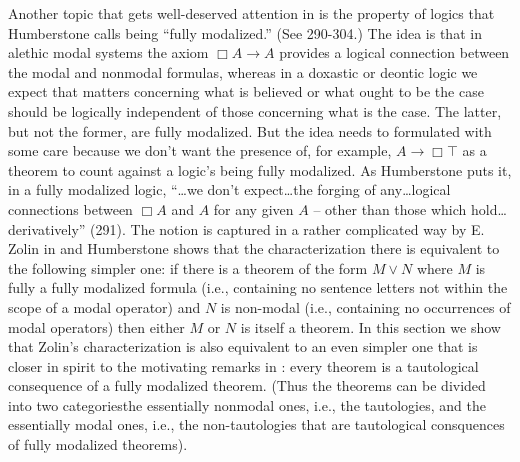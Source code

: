 \documentclass[11pt]{article}
\begin{document}
Another topic that gets well-deserved attention in \citet{Humberstone2016} is the property of logics that Humberstone calls being ``fully modalized.'' (See 290-304.) The idea is that in alethic modal systems the axiom $\Box A\rightarrow A$ provides a logical connection between the modal and nonmodal formulas, whereas in a doxastic or deontic logic we expect that matters concerning what is believed or what ought to be the case should be logically independent of those concerning what is the case. The latter, but not the former, are fully modalized. But the idea needs to formulated with some care because we don't want the presence of, for example, $A\rightarrow \Box \top $ as a theorem to count against a logic's being fully modalized. As Humberstone puts it, in a fully modalized logic, ``{\ldots}we don't expect{\ldots}the forging of any{\ldots}logical connections between $\Box A$ and $A$ for any given $A$ -- other than those which hold{\ldots}derivatively'' (291). The notion is captured in a rather complicated way by E. Zolin in \citet{Zolin.2000} and Humberstone shows that the characterization there is equivalent to the following simpler one: if there is a theorem of the form $M\vee N$ where $M$ is fully a fully modalized formula (i.e., containing no sentence letters not within the scope of a modal operator) and $N$ is non-modal (i.e., containing no occurrences of modal operators) then either $M$ or $N$ is itself a theorem. In this section we show that Zolin's characterization is also equivalent to an even simpler one that is closer in spirit to the motivating remarks in \citet{Humberstone2016}: every theorem is a tautological consequence of a fully modalized theorem. (Thus the theorems can be divided into two categories\textemdash the essentially nonmodal ones, i.e., the tautologies, and the essentially modal ones, i.e., the non-tautologies that are tautological consquences of fully modalized theorems). 
\end{document}
